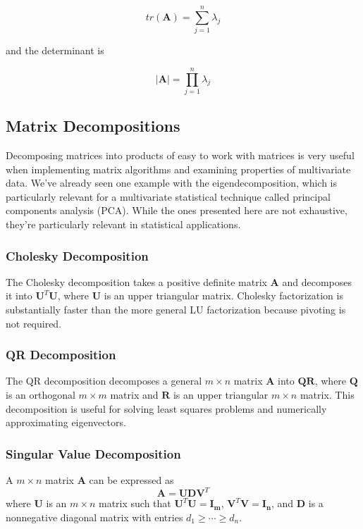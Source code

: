 \documentclass[11pt]{article}
\theoremstyle{definition}
\begin{document}
\[tr(\mathbf{A}) = \sum_{j = 1}^n \lambda_j\]

and the determinant is 

\[|\mathbf{A}| = \prod_{j=1}^n \lambda_j \]


\subsection{Matrix Decompositions}
Decomposing matrices into products of easy to work with matrices is very useful when implementing matrix algorithms and examining properties of multivariate data.  We've already seen one example with the eigendecomposition, which is particularly relevant for a multivariate statistical technique called principal components analysis (PCA).  While the ones presented here are not exhaustive, they're particularly relevant in statistical applications.

\subsubsection{Cholesky Decomposition}
The Cholesky decomposition takes a positive definite matrix $\mathbf{A}$ and decomposes it into $\mathbf{U}^T\mathbf{U}$, where $\mathbf{U}$ is an upper triangular matrix.  Cholesky factorization is substantially faster than the more general LU factorization because pivoting is not required.  

\subsubsection{QR Decomposition}
The QR decomposition decomposes a general $m \times n$ matrix $\mathbf{A}$ into $\mathbf{QR}$, where $\mathbf{Q}$ is an orthogonal $m \times m$ matrix and $\mathbf{R}$ is an upper triangular $m \times n$ matrix.  This decomposition is useful for solving least squares problems and numerically approximating eigenvectors. 

\subsubsection{Singular Value Decomposition}
A $m \times n$ matrix $\mathbf{A}$ can be expressed as
$$\mathbf{A} = \mathbf{UDV}^T$$ where $\mathbf{U}$ is an $m \times n$ matrix such that $\mathbf{U}^T\mathbf{U} = \mathbf{I_m}$, $\mathbf{V}^T\mathbf{V} = \mathbf{I_n}$, and $\mathbf{D}$ is a nonnegative diagonal matrix with entries $d_1 \geq \cdots \geq d_n$.\\
\end{document}

